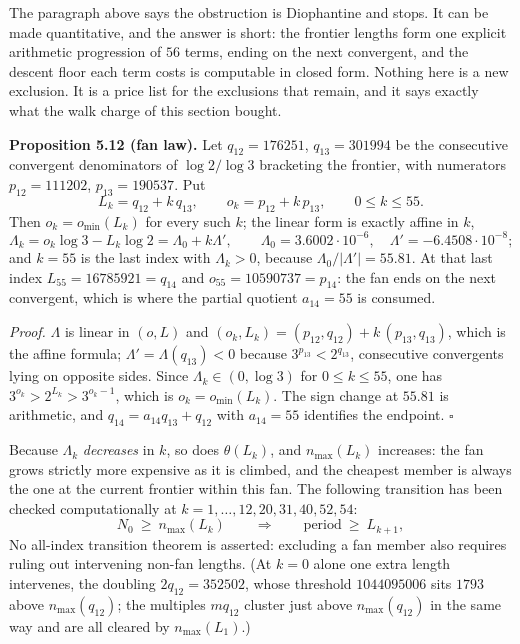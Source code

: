 \documentclass[12pt]{article}
\begin{document}
The paragraph above says the obstruction is Diophantine and stops. It
can be made quantitative, and the answer is short: the frontier lengths
form one explicit arithmetic progression of \(56\) terms, ending on the
next convergent, and the descent floor each term costs is computable in
closed form. Nothing here is a new exclusion. It is a price list for the
exclusions that remain, and it says exactly what the walk charge of this
section bought.

\textbf{Proposition 5.12 (fan law).} Let \(q_{12}=176251\),
\(q_{13}=301994\) be the consecutive convergent denominators of
\(\log 2/\log 3\) bracketing the frontier, with numerators
\(p_{12}=111202\), \(p_{13}=190537\). Put \[
L_k=q_{12}+k\,q_{13},\qquad o_k=p_{12}+k\,p_{13},\qquad 0\le k\le 55 .
\] Then \(o_k=o_{\min}(L_k)\) for every such \(k\); the linear form is
exactly affine in \(k\), \[
\Lambda_k=o_k\log 3-L_k\log 2=\Lambda_0+k\Lambda',
\qquad
\Lambda_0=3.6002\cdot10^{-6},
\quad
\Lambda'=-6.4508\cdot10^{-8};
\] and \(k=55\) is the last index with \(\Lambda_k>0\), because
\(\Lambda_0/\lvert\Lambda'\rvert=55.81\). At that last index
\(L_{55}=16785921=q_{14}\) and \(o_{55}=10590737=p_{14}\): the fan ends
on the next convergent, which is where the partial quotient
\(a_{14}=55\) is consumed.

\emph{Proof.} \(\Lambda\) is linear in \((o,L)\) and
\((o_k,L_k)=(p_{12},q_{12})+k\,(p_{13},q_{13})\), which is the affine
formula; \(\Lambda'=\Lambda(q_{13})<0\) because
\(3^{p_{13}}<2^{q_{13}}\), consecutive convergents lying on opposite
sides. Since \(\Lambda_k\in(0,\log 3)\) for \(0\le k\le 55\), one has
\(3^{o_k}>2^{L_k}>3^{o_k-1}\), which is \(o_k=o_{\min}(L_k)\). The sign
change at \(55.81\) is arithmetic, and \(q_{14}=a_{14}q_{13}+q_{12}\)
with \(a_{14}=55\) identifies the endpoint. \(\square\)

Because \(\Lambda_k\) \emph{decreases} in \(k\), so does
\(\theta(L_k)\), and \(n_{\max}(L_k)\) increases: the fan grows strictly
more expensive as it is climbed, and the cheapest member is always the
one at the current frontier within this fan. The following transition
has been checked computationally at \(k=1,\ldots,12,20,31,40,52,54\): \[
N_0\ \ge\ n_{\max}(L_k)
\qquad\Longrightarrow\qquad
\text{period}\ \ge\ L_{k+1},
\] No all-index transition theorem is asserted: excluding a fan member
also requires ruling out intervening non-fan lengths. (At \(k=0\) alone
one extra length intervenes, the doubling \(2q_{12}=352502\), whose
threshold \(1044095006\) sits \(1793\) above \(n_{\max}(q_{12})\); the
multiples \(mq_{12}\) cluster just above \(n_{\max}(q_{12})\) in the
same way and are all cleared by \(n_{\max}(L_1)\).)
\end{document}
